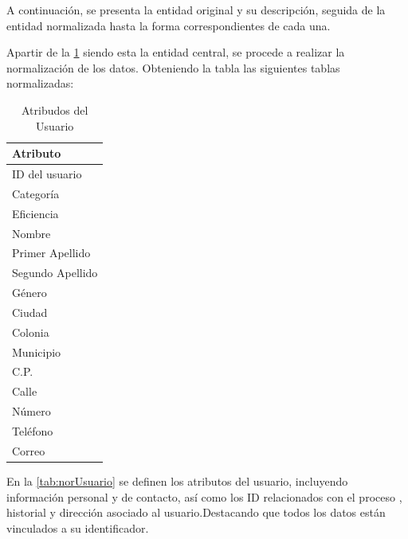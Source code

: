 A continuación, se presenta la entidad original y su descripción, seguida de la entidad
normalizada hasta la forma correspondientes de cada una.

Apartir de la \cref{tab:Usuario} siendo esta la entidad
central, se procede a realizar la normalización de los datos.
Obteniendo la tabla  las siguientes tablas normalizadas:

\begin{table}[H]
    \centering
    \caption{Atribudos del Usuario} %
    \label{tab:Usuario}
    \footnotesize %

    \begin{tabular}{|>{\raggedright\arraybackslash}p{2.5cm}|}
        \hline
        \textbf{Atributo}       \\ \hline
        ID del usuario          \\ \hline
        Categoría                \\ \hline
        Eficiencia              \\ \hline
        Nombre                  \\ \hline 
        Primer Apellido         \\ \hline
        Segundo Apellido        \\ \hline
        Género                  \\ \hline
        Ciudad                  \\ \hline
        Colonia                 \\ \hline
        Municipio              \\ \hline
        C.P.                   \\ \hline
        Calle                  \\ \hline
        Número                 \\ \hline
        Teléfono               \\ \hline
        Correo                  \\ \hline
        
    \end{tabular}
\end{table}

En la  \cref{tab:norUsuario} se definen los atributos del usuario, incluyendo
información personal y de contacto, así como los ID relacionados con el proceso , historial y
dirección asociado al usuario.Destacando que todos los datos están vinculados a su
identificador.

